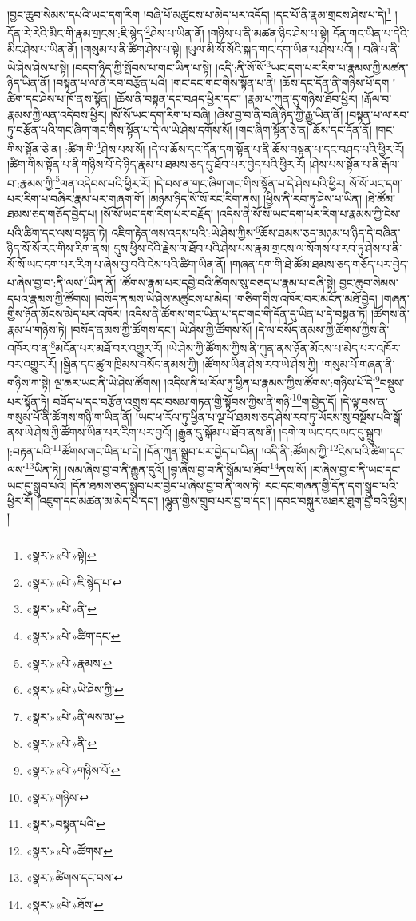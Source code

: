 །བྱང་ཆུབ་སེམས་དཔའི་ཡང་དག་རིག །བཞི་པོ་མཚུངས་པ་མེད་པར་འདོད། །དང་པོ་ནི་རྣམ་གྲངས་ཤེས་པ་དེ།\footnote{«སྣར་»«པེ་»སྟེ།} །དོན་རེ་རེའི་མིང་གི་རྣམ་གྲངས་:ཇི་སྙེད་\footnote{«སྣར་»«པེ་»ཇི་སྙེད་པ་}ཤེས་པ་ཡིན་ནོ། །གཉིས་པ་ནི་མཚན་ཉིད་ཤེས་པ་སྟེ། དོན་གང་ཡིན་པ་དེའི་མིང་ཤེས་པ་ཡིན་ནོ། །གསུམ་པ་ནི་ཚིག་ཤེས་པ་སྟེ། །ཡུལ་མི་སོ་སོའི་སྐད་གང་དག་ཡིན་པ་ཤེས་པའོ། །
བཞི་པ་ནི་ཡེ་ཤེས་ཤེས་པ་སྟེ། །བདག་ཉིད་ཀྱི་སྤོབས་པ་གང་ཡིན་པ་སྟེ། །འདི་:ནི་སོ་སོ་\footnote{«སྣར་»«པེ་»ནི་}ཡང་དག་པར་རིག་པ་རྣམས་ཀྱི་མཚན་ཉིད་ཡིན་ནོ། །བསྟན་པ་ལ་ནི་རབ་བརྩོན་པའི། །གང་དང་གང་གིས་སྟོན་པ་ནི། །ཆོས་དང་དོན་ནི་གཉིས་པོ་དག །ཚིག་དང་ཤེས་པ་ཁོ་ནས་སྟོན། །ཆོས་ནི་བསྟན་དང་བཤད་ཕྱིར་དང་། །རྣམ་པ་ཀུན་དུ་གཉིས་ཐོབ་ཕྱིར། །རྒོལ་བ་རྣམས་ཀྱི་ལན་འདེབས་ཕྱིར། །སོ་སོ་ཡང་དག་རིག་པ་བཞི། །ཞེས་བྱ་བ་ནི་བཞི་ཉིད་ཀྱི་རྒྱུ་ཡིན་ནོ། །བསྟན་པ་ལ་རབ་ཏུ་བརྩོན་པའི་གང་ཞིག་གང་གིས་སྟོན་པ་དེ་ལ་ཡེ་ཤེས་དགོས་སོ། །གང་ཞིག་སྟོན་ཅེ་ན། ཆོས་དང་དོན་ནོ། །གང་གིས་སྟོན་ཅེ་ན། :ཚིག་གི་\footnote{«སྣར་»«པེ་»ཚིག་དང་}ཤེས་པས་སོ། །དེ་ལ་ཆོས་དང་དོན་དག་སྟོན་པ་ནི་ཆོས་བསྟན་པ་དང་བཤད་པའི་ཕྱིར་རོ། །ཚིག་གིས་སྟོན་པ་ནི་གཉིས་པོ་དེ་ཉིད་རྣམ་པ་ཐམས་ཅད་དུ་ཐོབ་པར་བྱེད་པའི་ཕྱིར་རོ། །ཤེས་པས་སྟོན་པ་ནི་རྒོལ་བ་:རྣམས་ཀྱི་\footnote{«སྣར་»«པེ་»རྣམས་}ལན་འདེབས་པའི་ཕྱིར་རོ། །དེ་བས་ན་གང་ཞིག་གང་གིས་སྟོན་པ་དེ་ཤེས་པའི་ཕྱིར། སོ་སོ་ཡང་དག་པར་རིག་པ་བཞིར་རྣམ་པར་གཞག་གོ། །མཉམ་ཉིད་སོ་སོ་རང་རིག་ནས། །ཕྱིས་ནི་རབ་ཏུ་ཤེས་པ་ཡིན། །ཐེ་ཚོམ་ཐམས་ཅད་གཅོད་བྱེད་པ། །སོ་སོ་ཡང་དག་རིག་པར་བརྗོད། །འདིས་ནི་སོ་སོ་ཡང་དག་པར་རིག་པ་རྣམས་ཀྱི་ངེས་པའི་ཚིག་དང་ལས་བསྟན་ཏེ། འཇིག་རྟེན་ལས་འདས་པའི་:ཡེ་ཤེས་ཀྱིས་\footnote{«སྣར་»«པེ་»ཡེ་ཤེས་ཀྱི་}ཆོས་ཐམས་ཅད་མཉམ་པ་ཉིད་དེ་བཞིན་ཉིད་སོ་སོ་རང་གིས་རིག་ནས། དུས་ཕྱིས་དེའི་རྗེས་ལ་ཐོབ་པའི་ཤེས་པས་རྣམ་གྲངས་ལ་སོགས་པ་རབ་ཏུ་ཤེས་པ་ནི་སོ་སོ་ཡང་དག་པར་རིག་པ་ཞེས་བྱ་བའི་ངེས་པའི་ཚིག་ཡིན་ནོ། །གཞན་དག་གི་ཐེ་ཚོམ་ཐམས་ཅད་གཅོད་པར་བྱེད་པ་ཞེས་བྱ་བ་:ནི་ལས་\footnote{«སྣར་»«པེ་»ནི་ལས་མ་}ཡིན་ནོ། །ཚོགས་རྣམ་པར་དབྱེ་བའི་ཚིགས་སུ་བཅད་པ་རྣམ་པ་བཞི་སྟེ། བྱང་ཆུབ་སེམས་དཔའ་རྣམས་ཀྱི་ཚོགས། །བསོད་ནམས་ཡེ་ཤེས་མཚུངས་པ་མེད། །གཅིག་གིས་འཁོར་བར་མངོན་མཐོ་བྱེད། །གཞན་གྱིས་ཉོན་མོངས་མེད་པར་འཁོར། །འདིས་ནི་ཚོགས་གང་ཡིན་པ་དང་གང་གི་དོན་དུ་ཡིན་པ་དེ་བསྟན་ཏོ། །ཚོགས་ནི་རྣམ་པ་གཉིས་ཏེ། །བསོད་ནམས་ཀྱི་ཚོགས་དང་། ཡེ་ཤེས་ཀྱི་ཚོགས་སོ། །དེ་ལ་བསོད་ནམས་ཀྱི་ཚོགས་ཀྱིས་ནི་འཁོར་བ་ན་\footnote{«སྣར་»«པེ་»ནི་}མངོན་པར་མཐོ་བར་འགྱུར་རོ། །ཡེ་ཤེས་ཀྱི་ཚོགས་ཀྱིས་ནི་ཀུན་ནས་ཉོན་མོངས་པ་མེད་པར་འཁོར་བར་འགྱུར་རོ། །སྦྱིན་དང་ཚུལ་ཁྲིམས་བསོད་ནམས་ཀྱི། །ཚོགས་ཡིན་ཤེས་རབ་ཡེ་ཤེས་ཀྱི། །གསུམ་པོ་གཞན་ནི་གཉིས་ཀ་སྟེ། ལྔ་ཆར་ཡང་ནི་ཡེ་ཤེས་ཚོགས། །འདིས་ནི་ཕ་རོལ་ཏུ་ཕྱིན་པ་རྣམས་ཀྱིས་ཚོགས་:གཉིས་པོ་དེ་\footnote{«སྣར་»«པེ་»གཉིས་པོ་}བསྡུས་པར་སྟོན་ཏེ། བཟོད་པ་དང་བརྩོན་འགྲུས་དང་བསམ་གཏན་གྱི་སྟོབས་ཀྱིས་ནི་གཉི་\footnote{«སྣར་»གཉིས་}ག་བྱེད་དོ། །དེ་ལྟ་བས་ན་གསུམ་པོ་ནི་ཚོགས་གཉི་ག་ཡིན་ནོ། །ཡང་ཕ་རོལ་ཏུ་ཕྱིན་པ་ལྔ་པོ་ཐམས་ཅད་ཤེས་རབ་ཏུ་ཡོངས་སུ་བསྔོས་པའི་སྒོ་ནས་ཡེ་ཤེས་ཀྱི་ཚོགས་ཡིན་པར་རིག་པར་བྱའོ། །རྒྱུན་དུ་སྒོམ་པ་ཐོབ་ནས་ནི། །དགེ་ལ་ཡང་དང་ཡང་དུ་སྒྲུབ། །:བརྟན་པའི་\footnote{«སྣར་»བསྟན་པའི་}ཚོགས་གང་ཡིན་པ་དེ། །དོན་ཀུན་སྒྲུབ་པར་བྱེད་པ་ཡིན། །འདི་ནི་:ཚོགས་ཀྱི་\footnote{«སྣར་»«པེ་»ཚོགས་}ངེས་པའི་ཚིག་དང་ལས་\footnote{«སྣར་»ཚིགས་དང་བས་}ཡིན་ཏེ། །སམ་ཞེས་བྱ་བ་ནི་རྒྱུན་དུའོ། །བྷ་ཞེས་བྱ་བ་ནི་སྒོམ་པ་ཐོབ་\footnote{«སྣར་»«པེ་»ཐོས་}ནས་སོ། །ར་ཞེས་བྱ་བ་ནི་ཡང་དང་ཡང་དུ་སྒྲུབ་པའོ། །དོན་ཐམས་ཅད་སྒྲུབ་པར་བྱེད་པ་ཞེས་བྱ་བ་ནི་ལས་ཏེ། རང་དང་གཞན་གྱི་དོན་དག་སྒྲུབ་པའི་ཕྱིར་རོ། །འཇུག་དང་མཚན་མ་མེད་པ་དང་། །ལྷུན་གྱིས་གྲུབ་པར་བྱ་བ་དང་། །དབང་བསྐུར་མཐར་ཐུག་བྱ་བའི་ཕྱིར། །
